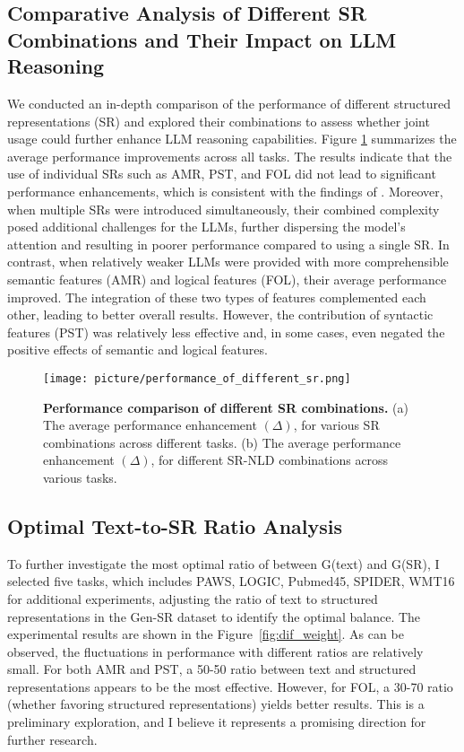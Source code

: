 \subsection{Comparative Analysis of Different SR Combinations and Their Impact on LLM Reasoning}
We conducted an in-depth comparison of the performance of different structured representations (SR) and explored their combinations to assess whether joint usage could further enhance LLM reasoning capabilities. Figure \ref{fig:performance_of_different_sr} summarizes the average performance improvements across all tasks. The results indicate that the use of individual SRs such as AMR, PST, and FOL did not lead to significant performance enhancements, which is consistent with the findings of \cite{jin2024analyzing}. Moreover, when multiple SRs were introduced simultaneously, their combined complexity posed additional challenges for the LLMs, further dispersing the model’s attention and resulting in poorer performance compared to using a single SR. In contrast, when relatively weaker LLMs were provided with more comprehensible semantic features (AMR) and logical features (FOL), their average performance improved. The integration of these two types of features complemented each other, leading to better overall results. However, the contribution of syntactic features (PST) was relatively less effective and, in some cases, even negated the positive effects of semantic and logical features.

\begin{figure}[!ht]
\centering
\vspace{0in}
\texttt{[image: picture/performance\_of\_different\_sr.png]}
\caption{\textbf{Performance comparison of different SR combinations.} (a) The average performance enhancement $(\Delta)$, for various SR combinations across different tasks. (b) The average performance enhancement $(\Delta)$, for different SR-NLD combinations across various tasks.}
\label{fig:performance_of_different_sr}
\end{figure}


\subsection{Optimal Text-to-SR Ratio Analysis}
\label{app:ratio_select}
To further investigate the most optimal ratio of between G(text) and G(SR), I selected five tasks, which includes PAWS, LOGIC, Pubmed45, SPIDER, WMT16 for additional experiments, adjusting the ratio of text to structured representations in the Gen-SR dataset to identify the optimal balance. The experimental results are shown in the Figure~\ref{fig:dif_weight}. As can be observed, the fluctuations in performance with different ratios are relatively small. For both AMR and PST, a 50-50 ratio between text and structured representations appears to be the most effective. However, for FOL, a 30-70 ratio (whether favoring structured representations) yields better results. This is a preliminary exploration, and I believe it represents a promising direction for further research.

